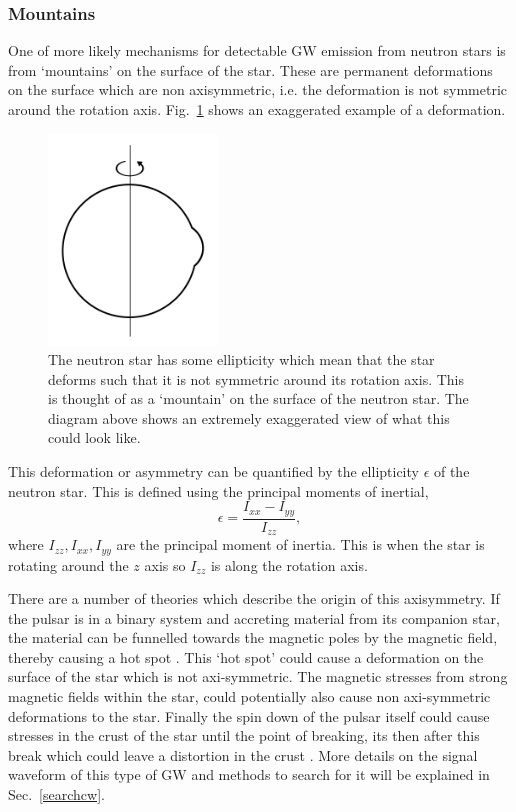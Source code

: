 \subsubsection{Mountains}

One of more likely mechanisms for detectable \gls{GW} emission from neutron stars is from `mountains' on the surface of the star.
These are permanent deformations on the surface which are non axisymmetric, i.e. the deformation is not symmetric around the rotation axis.
Fig.~\ref{intro:source:cw:mountain} shows an exaggerated example of a deformation.
\begin{figure}[h]
	\centering
	\includegraphics[width=0.4\textwidth]{C1_intro/neutron_star_mountain.pdf}
	\caption{The neutron star has some ellipticity which mean that the star deforms such that it is not symmetric around its rotation axis. This is thought of as a `mountain' on the surface of the neutron star. The diagram above shows an extremely exaggerated view of what this could look like.}
	\label{intro:source:cw:mountain}
\end{figure}

This deformation or asymmetry can be quantified by the ellipticity $\epsilon$ of the neutron star.
This is defined using the principal moments of inertial,
\begin{equation}
\label{ellipticity}
\epsilon = \frac{I_{xx}-I_{yy}}{I_{zz}},
\end{equation}
where $I_{zz},I_{xx},I_{yy}$ are the principal moment of inertia.
This is when the star is rotating around the $z$ axis so $I_{zz}$ is along the rotation axis. 

There are a number of theories which describe the origin of this axisymmetry.
If the pulsar is in a binary system and accreting material from its companion star, the material can be funnelled towards the magnetic poles by the magnetic field, thereby causing a hot spot \citep{haskell2015DetectingGravitational}.
This `hot spot' could cause a deformation on the surface of the star which is not axi-symmetric. 
The magnetic stresses from strong magnetic fields within the star, could potentially also cause non axi-symmetric deformations to the star.
Finally the spin down of the pulsar itself could cause stresses in the crust of the star until the point of breaking, its then after this break which could leave a distortion in the crust \citep{becker2009NeutronStars}.
More details on the signal waveform of this type of \gls{GW} and methods to search for it will be explained in Sec.~\ref{searchcw}.
 
